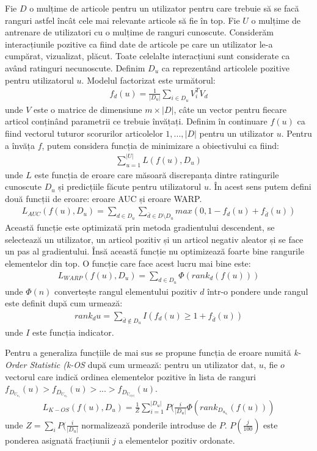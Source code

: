 Fie $D$ o mulțime de articole pentru un utilizator pentru care trebuie să se facă ranguri astfel încât cele mai relevante articole să fie în top. Fie $U$ o mulțime de antrenare de utilizatori cu o mulțime de ranguri cunoscute. Considerăm interacțiunile pozitive ca fiind date de articole pe care un utilizator le-a cumpărat, vizualizat, plăcut. Toate celelalte interacțiuni sunt considerate ca având ratinguri necunoscute. Definim $D_u$ ca reprezentând articolele pozitive pentru utilizatorul $u$. Modelul factorizat este următorul:
\begin{align}
	f_d(u) = \frac{1}{|D_u|} \sum_{i \in D_u} V_i^T V_d
\end{align}
unde $V$ este o matrice de dimensiune $m \times |D|$, câte un vector pentru fiecare articol conținând parametrii ce trebuie învățați. Definim în continuare $f(u)$ ca fiind vectorul tuturor scorurilor articolelor $1,...,|D|$ pentru un utilizator $u$. Pentru a învăța $f$, putem considera funcția de minimizare a obiectivului ca fiind:
\begin{align}
	\sum_{u=1}^{|U|}L(f(u),D_u)
\end{align}
unde $L$ este funcția de eroare care măsoară discrepanța dintre ratingurile cunoscute $D_u$ și predicțiile făcute pentru utilizatorul $u$. În acest sens putem defini două funcții de eroare: eroare AUC și eroare WARP.
\begin{align}
	L_{AUC}(f(u),D_u) = \sum_{d \in D_u} \sum_{\bar{d} \in D \setminus D_u} max(0, 1 - f_d(u) + f_{\bar{d}}(u))
\end{align}
Această funcție este optimizată prin metoda gradientului descendent, se selectează un utilizator, un articol pozitiv și un articol negativ aleator și se face un pas al gradientului.
Însă această funcție nu optimizează foarte bine rangurile elementelor din top. O funcție care face acest lucru mai bine este:
\begin{align}
	L_{WARP}(f(u), D_u) = \sum_{d \in D_u} \Phi(rank_d(f(u)))
\end{align}
unde $\Phi(n)$ convertește rangul elementului pozitiv $d$ într-o pondere unde rangul este definit după cum urmează:
\begin{align}
	rank_d{u} = \sum_{\bar{d} \not\in D_u} I(f_d(u) \geq 1 + f_{\bar{d}}(u))
\end{align}
unde $I$ este funcția indicator.

Pentru a generaliza funcțiile de mai sus se propune funcția de eroare numită \textit{k-Order Statistic (k-OS} după cum urmează: pentru un utilizator dat, $u$, fie $o$ vectorul care indică ordinea elementelor pozitive în lista de ranguri $f_{D_{U_{o_1}}}(u) > f_{D_{U_{o_2}}}(u) > ... > f_{D_{U_{o{|s|}}}}(u)$.
\begin{align}
	L_{K-OS}(f(u),D_u) = \frac{1}{Z} \sum_{i=1}^{|D_u|}P(\frac{i}{|D_u|}\Phi(rank_{D_{u_{o_i}}}(f(u)))
\end{align}
unde $Z = \sum_iP(\frac{i}{|D_u|}$ normalizează ponderile introduse de $P$. $P(\frac{j}{100})$ este ponderea asignată fracțiunii $j$ a elementelor pozitiv ordonate. 

